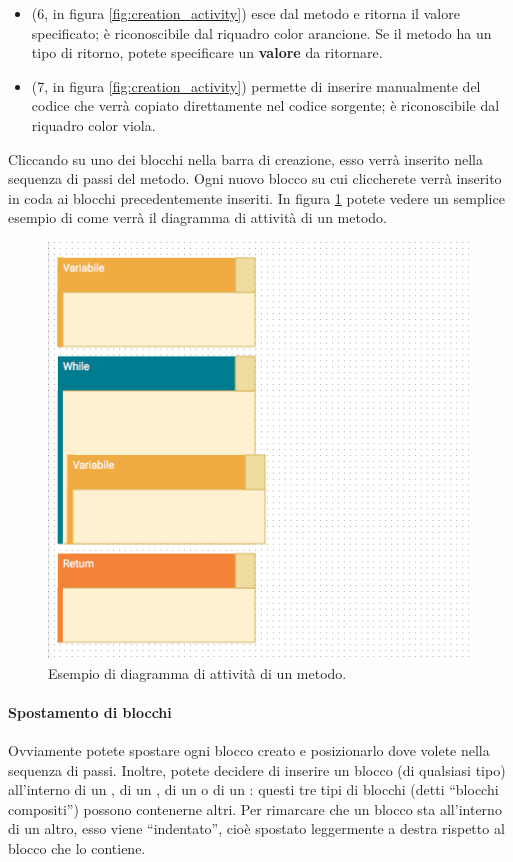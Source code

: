 \begin{itemize}
	\item {} (6, in figura \ref{fig:creation_activity}) esce dal metodo e ritorna il valore specificato; è riconoscibile dal riquadro color arancione. Se il metodo ha un tipo di ritorno, potete specificare un \textbf{valore} da ritornare.
	\item {} (7, in figura \ref{fig:creation_activity}) permette di inserire manualmente del codice che verrà copiato direttamente nel codice sorgente; è riconoscibile dal riquadro color viola.
\end{itemize}
Cliccando su uno dei blocchi nella barra di creazione, esso verrà inserito nella sequenza di passi del metodo. Ogni nuovo blocco su cui cliccherete verrà inserito in coda ai blocchi precedentemente inseriti. In figura \ref{fig:algorithm} potete vedere un semplice esempio di come verrà il diagramma di attività di un metodo.

\begin{figure}[h]
\centering
	\includegraphics[scale=0.4]{img/algorithm}
	\caption{Esempio di diagramma di attività di un metodo.}
	\label{fig:algorithm}
\end{figure}

\paragraph{Spostamento di blocchi} Ovviamente potete spostare ogni blocco creato e posizionarlo dove volete nella sequenza di passi. Inoltre, potete decidere di inserire un blocco (di qualsiasi tipo) all'interno di un , di un , di un  o di un : questi tre tipi di blocchi (detti “blocchi compositi”) possono contenerne altri. Per rimarcare che un blocco sta all'interno di un altro, esso viene “indentato”, cioè spostato leggermente a destra rispetto al blocco che lo contiene.

